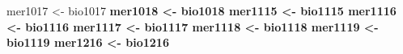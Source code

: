 \documentclass[
]{article}
\newenvironment{Shaded}{\begin{snugshade}}{\end{snugshade}}
\newcommand{\KeywordTok}[1]{\textcolor[rgb]{0.13,0.29,0.53}{\textbf{#1}}}
\newcommand{\NormalTok}[1]{#1}
\newcommand{\OperatorTok}[1]{\textcolor[rgb]{0.81,0.36,0.00}{\textbf{#1}}}
\newcommand{\StringTok}[1]{\textcolor[rgb]{0.31,0.60,0.02}{#1}}
\begin{document}
\begin{Shaded}
\begin{Highlighting}[]
{{{{{{{\NormalTok{mer1017 <-}\StringTok{ }\NormalTok{bio1017 }\OperatorTok{%>%}\StringTok{ }\KeywordTok{select}\NormalTok{(}\StringTok{'COUNTY_PLOT_SUB'}\NormalTok{, }\StringTok{'bio_change'}\NormalTok{,}\StringTok{'SPCD'}\NormalTok{,}\StringTok{'STDAGE'}\NormalTok{,}\StringTok{'BA'}\NormalTok{,}\StringTok{"COUNTY_PLOT"}\NormalTok{,}\StringTok{"tpha"}\NormalTok{)}
\NormalTok{mer1018 <-}\StringTok{ }\NormalTok{bio1018 }\OperatorTok{%>%}\StringTok{ }\KeywordTok{select}\NormalTok{(}\StringTok{'COUNTY_PLOT_SUB'}\NormalTok{, }\StringTok{'bio_change'}\NormalTok{,}\StringTok{'SPCD'}\NormalTok{,}\StringTok{'STDAGE'}\NormalTok{,}\StringTok{'BA'}\NormalTok{,}\StringTok{"COUNTY_PLOT"}\NormalTok{,}\StringTok{"tpha"}\NormalTok{)}
\NormalTok{mer1115 <-}\StringTok{ }\NormalTok{bio1115 }\OperatorTok{%>%}\StringTok{ }\KeywordTok{select}\NormalTok{(}\StringTok{'COUNTY_PLOT_SUB'}\NormalTok{, }\StringTok{'bio_change'}\NormalTok{,}\StringTok{'SPCD'}\NormalTok{,}\StringTok{'STDAGE'}\NormalTok{,}\StringTok{'BA'}\NormalTok{,}\StringTok{"COUNTY_PLOT"}\NormalTok{,}\StringTok{"tpha"}\NormalTok{)}
\NormalTok{mer1116 <-}\StringTok{ }\NormalTok{bio1116 }\OperatorTok{%>%}\StringTok{ }\KeywordTok{select}\NormalTok{(}\StringTok{'COUNTY_PLOT_SUB'}\NormalTok{, }\StringTok{'bio_change'}\NormalTok{,}\StringTok{'SPCD'}\NormalTok{,}\StringTok{'STDAGE'}\NormalTok{,}\StringTok{'BA'}\NormalTok{,}\StringTok{"COUNTY_PLOT"}\NormalTok{,}\StringTok{"tpha"}\NormalTok{)}
\NormalTok{mer1117 <-}\StringTok{ }\NormalTok{bio1117 }\OperatorTok{%>%}\StringTok{ }\KeywordTok{select}\NormalTok{(}\StringTok{'COUNTY_PLOT_SUB'}\NormalTok{, }\StringTok{'bio_change'}\NormalTok{,}\StringTok{'SPCD'}\NormalTok{,}\StringTok{'STDAGE'}\NormalTok{,}\StringTok{'BA'}\NormalTok{,}\StringTok{"COUNTY_PLOT"}\NormalTok{,}\StringTok{"tpha"}\NormalTok{)}
\NormalTok{mer1118 <-}\StringTok{ }\NormalTok{bio1118 }\OperatorTok{%>%}\StringTok{ }\KeywordTok{select}\NormalTok{(}\StringTok{'COUNTY_PLOT_SUB'}\NormalTok{, }\StringTok{'bio_change'}\NormalTok{,}\StringTok{'SPCD'}\NormalTok{,}\StringTok{'STDAGE'}\NormalTok{,}\StringTok{'BA'}\NormalTok{,}\StringTok{"COUNTY_PLOT"}\NormalTok{,}\StringTok{"tpha"}\NormalTok{)}
\NormalTok{mer1119 <-}\StringTok{ }\NormalTok{bio1119 }\OperatorTok{%>%}\StringTok{ }\KeywordTok{select}\NormalTok{(}\StringTok{'COUNTY_PLOT_SUB'}\NormalTok{, }\StringTok{'bio_change'}\NormalTok{,}\StringTok{'SPCD'}\NormalTok{,}\StringTok{'STDAGE'}\NormalTok{,}\StringTok{'BA'}\NormalTok{,}\StringTok{"COUNTY_PLOT"}\NormalTok{,}\StringTok{"tpha"}\NormalTok{)}
\NormalTok{mer1216 <-}\StringTok{ }\NormalTok{bio1216 }\OperatorTok{%>%}\StringTok{ }\KeywordTok{select}\NormalTok{(}\StringTok{'COUNTY_PLOT_SUB'}\NormalTok{, }\StringTok{'bio_change'}\NormalTok{,}\StringTok{'SPCD'}\NormalTok{,}\StringTok{'STDAGE'}\NormalTok{,}\StringTok{'BA'}\NormalTok{,}\StringTok{"COUNTY_PLOT"}\NormalTok{,}\StringTok{"tpha"}\NormalTok{)}
}}}}}}}}}}}}}}}
\end{Highlighting}
\end{Shaded}
\end{document}
